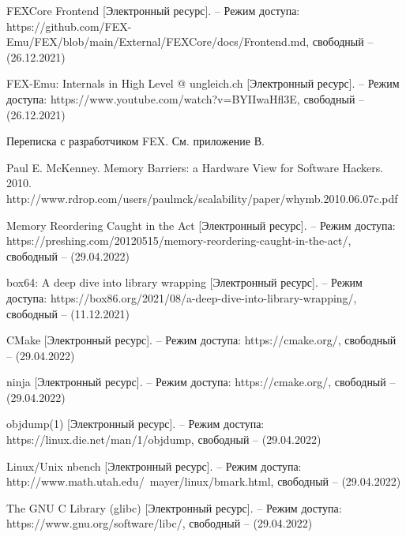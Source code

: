 \begin{thebibliography}{}
FEXCore Frontend [Электронный ресурс]. -- Режим доступа: 	https://github.com/FEX-Emu/FEX/blob/main/External/FEXCore/docs/Frontend.md,
свободный -- (26.12.2021)	

FEX-Emu: Internals in High Level @ ungleich.ch [Электронный ресурс]. -- Режим доступа: 		https://www.youtube.com/watch?v=BYIIwaHfl3E,
свободный -- (26.12.2021)

Переписка с разработчиком FEX. См. приложение В.

	Paul E. McKenney. Memory Barriers: a Hardware View for Software Hackers. 2010. http://www.rdrop.com/users/paulmck/scalability/paper/whymb.2010.06.07c.pdf
	
	Memory Reordering Caught in the Act [Электронный ресурс]. -- Режим доступа: https://preshing.com/20120515/memory-reordering-caught-in-the-act/,
	свободный -- (29.04.2022)
	
box64: A deep dive into library wrapping [Электронный ресурс]. -- Режим доступа: https://box86.org/2021/08/a-deep-dive-into-library-wrapping/,
свободный -- (11.12.2021)
	

	CMake [Электронный ресурс]. -- Режим доступа: https://cmake.org/, свободный -- (29.04.2022)

	ninja [Электронный ресурс]. -- Режим доступа: https://cmake.org/, свободный -- (29.04.2022)


	objdump(1) [Электронный ресурс]. -- Режим доступа: https://linux.die.net/man/1/objdump, свободный -- (29.04.2022)


	Linux/Unix nbench [Электронный ресурс]. -- Режим доступа: http://www.math.utah.edu/~mayer/linux/bmark.html, свободный -- (29.04.2022)
	
	The GNU C Library (glibc) [Электронный ресурс]. -- Режим доступа: https://www.gnu.org/software/libc/, свободный -- (29.04.2022)


	
\end{thebibliography}
\endgroup

\pagebreak